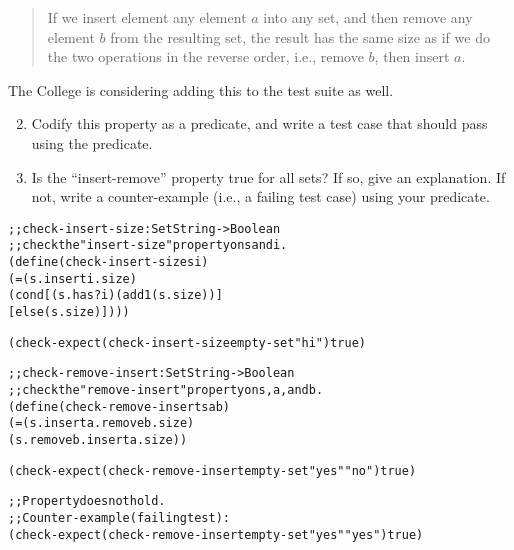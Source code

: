 \documentclass[12pt]{article}                   %
\newenvironment{solution}{\color{Red}}{}
\begin{document}
\begin{problem}
\begin{quote}
If we insert element any element $a$ into any set, and then remove any
element $b$ from the resulting set, the result has the same size as if
we do the two operations in the reverse order, i.e., remove $b$, then
insert $a$.
\end{quote}

\noindent
The College is considering adding this to the test suite as well.

\begin{enumerate}
\setcounter{enumi}{1}

\item Codify this property as a predicate, and write a test case that
  should pass using the predicate.

\item Is the ``insert-remove'' property true for all sets?  If so,
  give an explanation.  If not, write a counter-example (i.e., a
  failing test case) using your predicate.

\end{enumerate}

\begin{solution}
\begin{alltt}
;; check-insert-size : Set String -> Boolean
;; check the "insert-size" property on s and i.
(define (check-insert-size s i)
  (= (s . insert i . size)
     (cond [(s . has? i) (add1 (s . size))]
           [else               (s . size)])))

(check-expect (check-insert-size empty-set "hi") true)

;; check-remove-insert : Set String -> Boolean
;; check the "remove-insert" property on s, a, and b.
(define (check-remove-insert s a b)
  (= (s . insert a . remove b . size)
     (s . remove b . insert a . size))

(check-expect (check-remove-insert empty-set "yes" "no") true)

;; Property does not hold.
;; Counter-example (failing test):
(check-expect (check-remove-insert empty-set "yes" "yes") true)
\end{alltt}
\end{solution}

\newpage
\ifrubric{}
\newpage
\fi
\end{problem}
\end{document}
